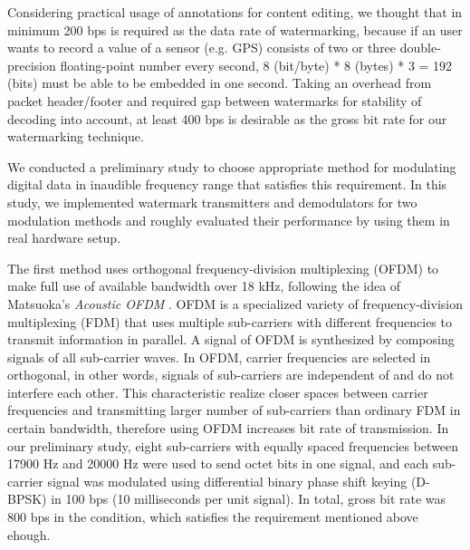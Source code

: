Considering practical usage of annotations for content editing, we thought that in minimum 200 bps is required as the data rate of watermarking, because if an user wants to record a value of a sensor (e.g. GPS) consists of two or three double-precision floating-point number every second, 8 (bit/byte) * 8 (bytes) * 3 = 192 (bits) must be able to be embedded in one second.
Taking an overhead from packet header/footer and required gap between watermarks for stability of decoding into account, at least 400 bps is desirable as the gross bit rate for our watermarking technique.

We conducted a preliminary study to choose appropriate method for modulating digital data in inaudible frequency range that satisfies this requirement.
In this study, we implemented watermark transmitters and demodulators for two modulation methods and roughly evaluated their performance by using them in real hardware setup.

The first method uses orthogonal frequency-division multiplexing (OFDM) to make full use of available bandwidth over 18 kHz, following the idea of Matsuoka's {\it Acoustic OFDM} \cite{matsuoka2008acoustic}.
OFDM is a specialized variety of frequency-division 
multiplexing (FDM) that uses multiple sub-carriers with different frequencies to transmit information in parallel.
A signal of OFDM is synthesized by composing signals of all sub-carrier waves.
In OFDM, carrier frequencies are selected in orthogonal, in other words, signals of sub-carriers are independent of and do not interfere each other.
This characteristic realize closer spaces between carrier frequencies and transmitting larger number of sub-carriers than ordinary FDM in certain bandwidth, therefore using OFDM increases bit rate of transmission.
In our preliminary study, eight sub-carriers with equally spaced frequencies between 17900 Hz and 20000 Hz were used to send octet bits in one signal, and each sub-carrier signal was modulated using differential binary phase shift keying (D-BPSK) in 100 bps (10 milliseconds per unit signal).
In total, gross bit rate was 800 bps in the condition, which satisfies the requirement mentioned above ehough.


